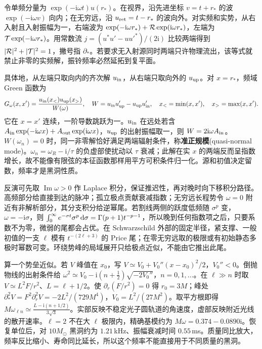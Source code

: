 令单频分量为 $\exp(-\mathrm i\omega t)u(r_*)$。在视界，沿先进坐标 $v=t+r_*$ 的波 $\exp(-\mathrm i\omega v)$ 向内；在无穷远，沿 $u_{\rm ret}=t-r_*$ 的波向外。对实频和实势，从右入射且入射振幅为一，右端波为 $\exp(-\mathrm i\omega r_*)+{\cal R}\exp(\mathrm i\omega r_*)$，左端为 ${\cal T}\exp(-\mathrm i\omega r_*)$。用常数流 $j=(u^*u'-u u'^*)/(2\mathrm i)$ 比较两端得到 $|{\cal R}|^2+|{\cal T}|^2=1$，撇号指 $\partial_*$。若要求无入射源同时两端只许物理流出，该等式就禁止非零的实频解，振铃频率必然延拓到复平面。

具体地，从左端只取向内的齐次解 $u_{\rm in}$，从右端只取向外的 $u_{\rm up}$。对 $x=r_*$，频域 Green 函数为
\[
 G_\omega(x,x')=\frac{u_{\rm in}(x_<)u_{\rm up}(x_>)}{W(\omega)},\quad
 W=u_{\rm in}u_{\rm up}'-u_{\rm up}u_{\rm in}',\quad
 x_<=\min(x,x'),\quad x_>=\max(x,x').
\]
它在 $x=x'$ 连续，一阶导数跳跃为一。$u_{\rm in}$ 在远处若含 $A_{\rm in}\exp(-\mathrm i\omega x)+A_{\rm out}\exp(\mathrm i\omega x)$，$u_{\rm up}$ 的出射振幅取一，则 $W=2\mathrm i\omega A_{\rm in}$。$W(\omega_n)=0$ 时，同一非零解恰好满足两端辐射条件，称\textbf{准正规模}(quasi-normal mode)。$\omega_n=\omega_R-\mathrm i/\tau$ 的负虚部使扰动以 $\tau$ 衰减；此解在实 $x$ 的两端反而呈指数增长，故不能像有限弦的本征函数那样用平方可积条件归一化。源和初值决定留数，频率才是黑洞性质。

反演可先取 $\operatorname{Im}\omega>0$ 作 Laplace 积分，保证推迟性，再对晚时向下移积分路径。高频部分给直接到达的脉冲；孤立极点贡献衰减指数；无穷远长程势令 $\omega=0$ 附近有非解析部分，其分支积分给逆幂尾。若割线两侧的跃度低频随 $\sigma^p$ 变，$\omega=-\mathrm i\sigma$，则 $\int_0^\infty e^{-\sigma t}\sigma^p\,\dd\sigma=\Gamma(p+1)t^{-p-1}$，所以晚到任何指数项之后，只要系数不为零，微弱的尾都会占优。在 Schwarzschild 外部的固定半径，紧支撑、一般初值的一支 $\ell$ 模有 $t^{-(2\ell+3)}$ 的 Price 尾；在零无穷远取的极限或有初始静态多极时幂数可变。环绕势峰的局域展开只给极点近似，不能由它推出此尾。

算一个势垒近似。若 $V$ 峰值在 $x_0$，写 $V\simeq V_0+V_0''(x-x_0)^2/2$，$V_0''<0$。倒抛物线的出射条件给 $\omega^2\simeq V_0-\mathrm i(n+\tfrac12)\sqrt{-2V_0''}$，$n=0,1,\ldots$。在 $\ell\gg n$ 时取 $V\simeq L^2F/r^2$、$L=\ell+1/2$。使 $\partial_r(F/r^2)=0$ 得 $r_0=3M$；峰处 $\partial_*^2 V=F^2\partial_r^2V=-2L^2/(729M^4)$，$V_0=L^2/(27M^2)$。取平方根即得 $M\omega_{\ell n}\simeq\frac{L-\mathrm i(n+1/2)}{3\sqrt3}$。实部反映不稳定光子圆轨道的角速度，虚部反映附近光线的散开速率。$\ell=2$ 不在大 $\ell$ 极限内，精确基模约为 $M\omega=0.374-0.0890\mathrm i$。恢复单位后，对 $10M_\odot$ 黑洞约为 $1.21$\,kHz、振幅衰减时间 $0.55$\,ms。质量同比放大，频率反比缩小、寿命同比延长，所以这个频率不能直接用于不同质量的黑洞。

